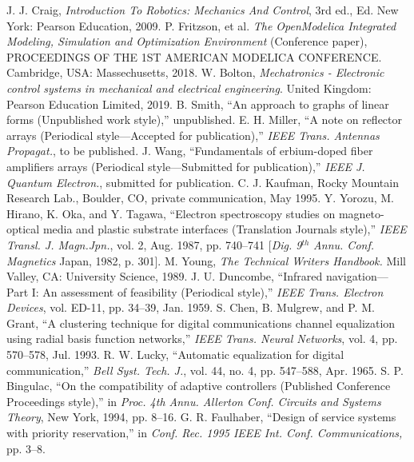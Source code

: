\documentclass[transmag]{IEEEtran}
\begin{document}
\clearpage
\newpage

\begin{thebibliography}{00}
 J. J. Craig, \emph{Introduction To Robotics: Mechanics And Control}, 3rd ed., Ed. New York: Pearson Education, 2009.
 P. Fritzson, et al. \emph{The OpenModelica Integrated Modeling, Simulation and Optimization Environment} (Conference paper), PROCEEDINGS OF THE 1ST AMERICAN MODELICA CONFERENCE$. $Cambridge, USA: Massechusetts, 2018.
 W. Bolton, \emph{Mechatronics - Electronic control systems in mechanical and electrical engineering}. United Kingdom: Pearson Education Limited, 2019.
 B. Smith, ``An approach to graphs of linear forms (Unpublished work style),'' unpublished.
 E. H. Miller, ``A note on reflector arrays (Periodical style---Accepted for publication),'' \emph{IEEE Trans. Antennas Propagat.}, to be published.
 J. Wang, ``Fundamentals of erbium-doped fiber amplifiers arrays (Periodical style---Submitted for publication),'' \emph{IEEE J. Quantum Electron.}, submitted for publication.
 C. J. Kaufman, Rocky Mountain Research Lab., Boulder, CO, private communication, May 1995.
 Y. Yorozu, M. Hirano, K. Oka, and Y. Tagawa, ``Electron spectroscopy studies on magneto-optical media and plastic substrate interfaces (Translation Journals style),'' \emph{IEEE Transl. J. Magn.Jpn.}, vol. 2, Aug. 1987, pp. 740--741 [\emph{Dig. 9}$^{th}$\emph{ Annu. Conf. Magnetics} Japan, 1982, p. 301].
 M. Young, \emph{The Technical Writers Handbook.} Mill Valley, CA: University Science, 1989.
 J. U. Duncombe, ``Infrared navigation---Part I: An assessment of feasibility (Periodical style),'' \emph{IEEE Trans. Electron Devices}, vol. ED-11, pp. 34--39, Jan. 1959.
 S. Chen, B. Mulgrew, and P. M. Grant, ``A clustering technique for digital communications channel equalization using radial basis function networks,'' \emph{IEEE Trans. Neural Networks}, vol. 4, pp. 570--578, Jul. 1993.
 R. W. Lucky, ``Automatic equalization for digital communication,'' \emph{Bell Syst. Tech. J.}, vol. 44, no. 4, pp. 547--588, Apr. 1965.
 S. P. Bingulac, ``On the compatibility of adaptive controllers (Published Conference Proceedings style),'' in \emph{Proc. 4th Annu. Allerton Conf. Circuits and Systems Theory}, New York, 1994, pp. 8--16.
 G. R. Faulhaber, ``Design of service systems with priority reservation,'' in \emph{Conf. Rec. 1995 IEEE Int. Conf. Communications,} pp. 3--8.

\end{thebibliography}
\end{document}
